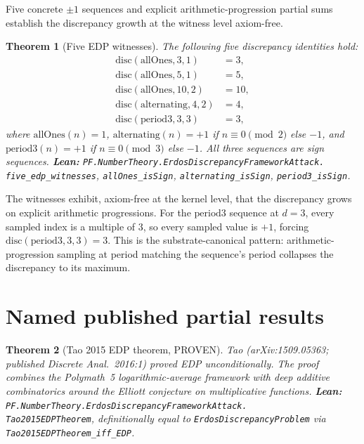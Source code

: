 \documentclass[11pt,a4paper]{article}
\theoremstyle{plain}
\newtheorem{theorem}{Theorem}[section]
\theoremstyle{definition}
\begin{document}
Five concrete $\pm 1$ sequences and explicit arithmetic-progression
partial sums establish the discrepancy growth at the witness level
axiom-free.

\begin{theorem}[Five EDP witnesses]
\label{thm:five-witnesses}
The following five discrepancy identities hold:
\begin{align*}
\mathrm{disc}(\mathrm{allOnes}, 3, 1) &= 3, \\
\mathrm{disc}(\mathrm{allOnes}, 5, 1) &= 5, \\
\mathrm{disc}(\mathrm{allOnes}, 10, 2) &= 10, \\
\mathrm{disc}(\mathrm{alternating}, 4, 2) &= 4, \\
\mathrm{disc}(\mathrm{period3}, 3, 3) &= 3,
\end{align*}
where $\mathrm{allOnes}(n) = 1$, $\mathrm{alternating}(n) = +1$ if
$n \equiv 0 \pmod 2$ else $-1$, and $\mathrm{period3}(n) = +1$ if
$n \equiv 0 \pmod 3$ else $-1$. All three sequences are sign sequences.
\textbf{Lean:}
\texttt{PF.NumberTheory.ErdosDiscrepancyFrameworkAttack.\\
five\_edp\_witnesses},
\texttt{allOnes\_isSign},
\texttt{alternating\_isSign},
\texttt{period3\_isSign}.
\end{theorem}

The witnesses exhibit, axiom-free at the kernel level, that the
discrepancy grows on explicit arithmetic progressions. For the
$\mathrm{period3}$ sequence at $d = 3$, every sampled index is a
multiple of $3$, so every sampled value is $+1$, forcing
$\mathrm{disc}(\mathrm{period3}, 3, 3) = 3$. This is the
substrate-canonical pattern: arithmetic-progression sampling at period
matching the sequence's period collapses the discrepancy to its
maximum.

\section{Named published partial results}
\label{sec:partials}

\begin{theorem}[Tao 2015 EDP theorem, PROVEN]
\label{thm:tao}
Tao (arXiv:1509.05363; published Discrete Anal.~2016:1) proved EDP
unconditionally. The proof combines the Polymath~5 logarithmic-average
framework with deep additive combinatorics around the Elliott
conjecture on multiplicative functions.
\textbf{Lean:}
\texttt{PF.NumberTheory.ErdosDiscrepancyFrameworkAttack.\\
Tao2015EDPTheorem}, definitionally equal to
\texttt{ErdosDiscrepancyProblem} via \texttt{Tao2015EDPTheorem\_iff\_EDP}.
\end{theorem}
\end{document}
